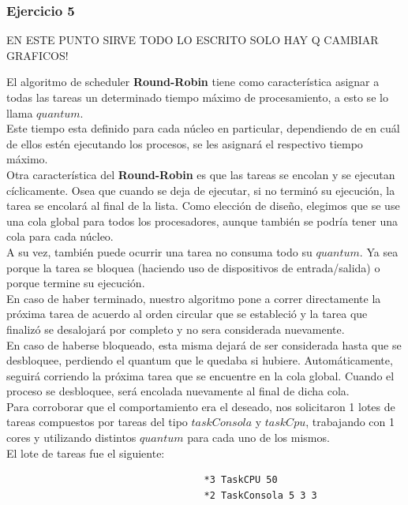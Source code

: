 \subsubsection[Resolución Ejercicio 5]{Ejercicio 5}

EN ESTE PUNTO SIRVE TODO LO ESCRITO SOLO HAY Q CAMBIAR GRAFICOS!

\indent El algoritmo de scheduler \textbf{Round-Robin} tiene como caracter\'istica asignar a todas las tareas 
un determinado tiempo m\'aximo de procesamiento, a esto se lo llama $quantum$. \\
\indent Este tiempo esta definido para cada n\'ucleo en particular, dependiendo de en cu\'al de ellos est\'en 
ejecutando los procesos, se les asignar\'a el respectivo tiempo m\'aximo.\\
\indent Otra caracter\'istica del \textbf{Round-Robin} es que las tareas se encolan y se ejecutan c\'iclicamente. 
Osea que cuando se deja de ejecutar, si no termin\'o su ejecuci\'on, la tarea se encolar\'a al final de la lista. 
Como elecci\'on de diseño, elegimos que se use una cola global para todos los procesadores, aunque tambi\'en
se podr\'ia tener una cola para cada n\'ucleo. \\
\indent A su vez, tambi\'en puede ocurrir una tarea no consuma todo su $quantum$. 
Ya sea porque la tarea se bloquea (haciendo uso de dispositivos de entrada/salida) o porque termine su ejecuci\'on.\\
\indent En caso de haber terminado, nuestro algoritmo pone a correr directamente la pr\'oxima tarea de acuerdo al orden 
circular que se estableci\'o y la tarea que finaliz\'o se desalojar\'a por completo y no sera considerada nuevamente. \\
\indent En caso de haberse bloqueado, esta misma dejar\'a de ser considerada hasta que se desbloquee, 
perdiendo el quantum que le quedaba si hubiere. 
Autom\'aticamente, seguir\'a corriendo la pr\'oxima tarea que se encuentre en la cola global. 
Cuando el proceso se desbloquee, ser\'a encolada nuevamente al final de dicha cola.   \\

\indent Para corroborar que el comportamiento era el deseado, nos solicitaron 1 lotes de tareas compuestos por tareas
del tipo $taskConsola$ y $taskCpu$, trabajando con 1 cores y utilizando distintos $quantum$ para cada uno de los mismos.\\

El lote de tareas fue el siguiente:
\begin{verbatim}
                                   *3 TaskCPU 50
                                   *2 TaskConsola 5 3 3
\end{verbatim}


